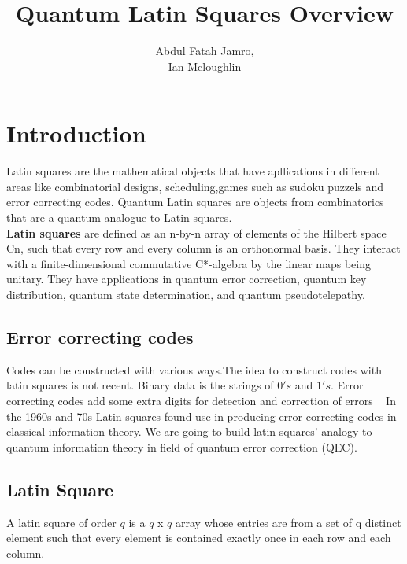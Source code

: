 \documentclass[a4paper, 12pt]{article}
\title{Quantum Latin Squares Overview}
\author{Abdul Fatah Jamro,\\  {Ian Mcloughlin}
}
\begin{document}
\maketitle

\section{Introduction}
Latin squares are the mathematical objects that have apllications in different areas 
like combinatorial designs, scheduling,games such as sudoku puzzels and error correcting codes.
Quantum Latin squares are objects from combinatorics that are a quantum analogue
to Latin squares. \\\textbf{Latin squares} are defined as an n-by-n array of elements of the 
Hilbert space Cn, such that every row and every column is an orthonormal basis. 
They interact with a finite-dimensional commutative C*-algebra by the linear maps
being unitary. They have applications in quantum error correction, quantum key 
distribution, quantum state determination, and quantum pseudotelepathy. ~\cite{Musto2019-vm}


\subsection{Error correcting codes}
Codes can be constructed with various ways.The idea to construct codes with latin squares
is not recent. Binary data is the strings of $0's$ and $1's$. Error correcting codes 
add some extra digits for detection and correction of errors ~\cite{QECC-QLS} 
In the 1960s and 70s Latin squares found use in producing error correcting codes
in classical information theory. We are going to build latin squares' analogy to
quantum information theory in field of quantum error correction (QEC).

\subsection{Latin Square}
A latin square of order $q$ is a $q$ x $q$ array whose entries are from a set of q distinct 
element such that every element is contained exactly once in each row and each column.
\end{document}
